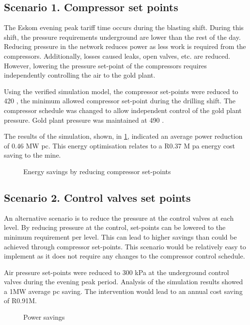 \subsection{Scenario 1. Compressor set points}
The Eskom evening peak tariff time occurs during the blasting shift. During this shift, the pressure requirements underground are lower than the rest of the day. Reducing pressure in the network reduces power as less work is required from the compressors. Additionally, losses caused leaks, open valves, etc. are reduced. However, lowering the pressure set-point of the compressors requires independently controlling the air to the gold plant. 
\par 
Using the verified simulation model, the compressor set-points were reduced to 420  , the minimum allowed compressor set-point during the drilling shift. The compressor schedule was changed to allow independent control of the gold plant pressure. Gold plant pressure was maintained at 490 . 
\par 
The results of the simulation, shown, in \cref{fig: CompSetpoints Results Beatrix}, indicated an average power reduction of 0.46 MW \gls{pc}. This energy optimisation relates to a R0.37 M \gls{pa} energy cost saving to the mine. 
\begin{figure}[h!]
	\centering
	
	\caption{Energy savings by reducing compressor set-points}
	\label{fig: CompSetpoints Results Beatrix}
\end{figure}

\subsection{Scenario 2. Control valves set points}
An alternative scenario is to reduce the pressure at the control valves at each level. By reducing pressure at the control, set-points can be lowered to the minimum requirement per level. This can lead to higher savings than could be achieved through compressor set-points. This scenario would be relatively easy to implement as it does not require any changes to the compressor control schedule.
\par 
Air pressure set-points were reduced to 300 kPa at  the underground control valves during the evening peak period. Analysis of the simulation results showed a  1MW average \gls{pc} saving. The intervention would lead to an annual cost saving of R0.91M.
\begin{figure}[h]
	\centering
	
	\caption{Power savings}
	\label{fig: Control Valve Results Beatrix}
\end{figure}

